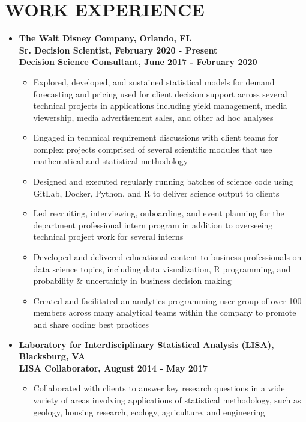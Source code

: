 \documentclass[10pt]{article}
\begin{document}
\section*{WORK EXPERIENCE}
\begin{itemize}
\item[] \textbf{The Walt Disney Company, Orlando, FL\\
Sr. Decision Scientist, February 2020 - Present \\
Decision Science Consultant, June 2017 - February 2020}
\begin{itemize}
\item Explored, developed, and sustained statistical models for demand forecasting and pricing used for client decision support across several technical projects in applications including yield management, media viewership, media advertisement sales, and other ad hoc analyses 
\item Engaged in technical requirement discussions with client teams for complex projects comprised of several scientific modules that use mathematical and statistical methodology
\item Designed and executed regularly running batches of science code using GitLab, Docker, Python, and R to deliver science output to clients
\item Led recruiting, interviewing, onboarding, and event planning for the department professional intern program in addition to overseeing technical project work for several interns
\item Developed and delivered educational content to business professionals on data science topics, including data visualization, R programming, and probability \& uncertainty in business decision making
\item Created and facilitated an analytics programming user group of over 100 members across many analytical teams within the company to promote and share coding best practices
\end{itemize}

\item[] \textbf{Laboratory for Interdisciplinary Statistical Analysis (LISA), Blacksburg, VA\\
LISA Collaborator, August 2014 - May 2017}
\begin{itemize}
\item Collaborated with clients to answer key research questions in a wide variety of areas involving applications of statistical methodology, such as geology, housing research, ecology, agriculture, and engineering
\end{itemize}



\end{itemize}
\end{document}
